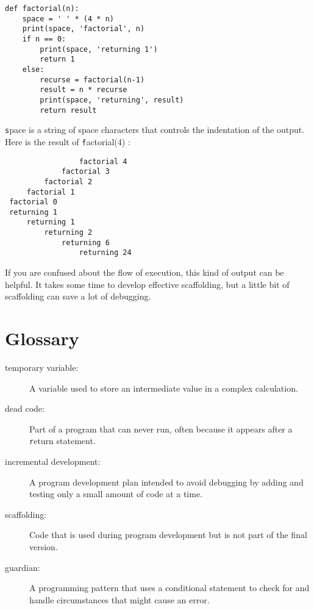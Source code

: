 \documentclass[
DIV=11,
fontsize=12,
twoside,
headinclude=false,
titlepage=firstiscover,
abstract=true,
headsepline=true,
footsepline=true,
chapterprefix=true, %
headings=big,
bibliography=totoc,%
captions=tableheading
]{scrbook}
\theoremstyle{definition}
\begin{document}
\begin{lstlisting}
def factorial(n):
    space = ' ' * (4 * n)
    print(space, 'factorial', n)
    if n == 0:
        print(space, 'returning 1')
        return 1
    else:
        recurse = factorial(n-1)
        result = n * recurse
        print(space, 'returning', result)
        return result
\end{lstlisting}
%
{\texttt space} is a string of space characters that controls the
indentation of the output.  Here is the result of {\texttt factorial(4)} :

\begin{lstlisting}
                 factorial 4
             factorial 3
         factorial 2
     factorial 1
 factorial 0
 returning 1
     returning 1
         returning 2
             returning 6
                 returning 24
\end{lstlisting}
%
If you are confused about the flow of execution, this kind of
output can be helpful.  It takes some time to develop effective
scaffolding, but a little bit of scaffolding can save a lot of debugging.


\section{Glossary}

\begin{description}

\item[temporary variable:]  A variable used to store an intermediate value in
a complex calculation.

\item[dead code:]  Part of a program that can never run, often because
it appears after a {\texttt return} statement.

\item[incremental development:]  A program development plan intended to
avoid debugging by adding and testing only
a small amount of code at a time.

\item[scaffolding:]  Code that is used during program development but is
not part of the final version.

\item[guardian:]  A programming pattern that uses a conditional
statement to check for and handle circumstances that
might cause an error.

\end{description}
\end{document}
